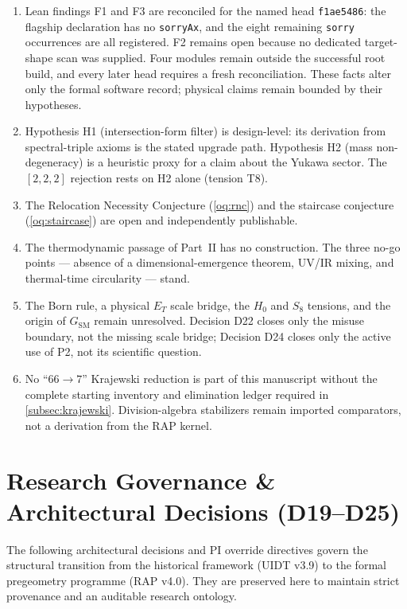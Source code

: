 \documentclass[12pt,a4paper,twoside]{article}
\theoremstyle{plain}
\theoremstyle{definition}
\theoremstyle{remark}
\begin{document}
\begin{enumerate}[leftmargin=1.6em,itemsep=0.25em]
\item Lean findings F1 and F3 are reconciled for the named head
\texttt{f1ae5486}: the flagship declaration has no \texttt{sorryAx}, and the
eight remaining \texttt{sorry} occurrences are all registered. F2 remains
open because no dedicated target-shape scan was supplied. Four modules remain
outside the successful root build, and every later head requires a fresh
reconciliation. These facts alter only the formal software record; physical
claims remain bounded by their hypotheses.
\item Hypothesis H1 (intersection-form filter) is design-level: its
derivation from spectral-triple axioms is the stated upgrade path.
Hypothesis H2 (mass non-degeneracy) is a heuristic proxy for a claim
about the Yukawa sector. The $[2,2,2]$ rejection rests on H2 alone
(tension T8).
\item The Relocation Necessity Conjecture (\cref{oq:rnc}) and the
staircase conjecture (\cref{oq:staircase}) are open and independently
publishable.
\item The thermodynamic passage of Part~II has no construction. The
three no-go points --- absence of a dimensional-emergence theorem,
UV/IR mixing, and thermal-time circularity --- stand.
\item The Born rule, a physical $E_T$ scale bridge, the $H_0$ and $S_8$
tensions, and the origin of $G_{\mathrm{SM}}$ remain unresolved. Decision
D22 closes only the misuse boundary, not the missing scale bridge; Decision
D24 closes only the active use of P2, not its scientific question.
\item No ``$66\to7$'' Krajewski reduction is part of this manuscript
without the complete starting inventory and elimination ledger required in
\cref{subsec:krajewski}. Division-algebra stabilizers remain imported
comparators, not a derivation from the RAP kernel.
\end{enumerate}


\clearpage
\appendix
\section{Research Governance \& Architectural Decisions (D19--D25)}
\label{app:pi-decisions}

The following architectural decisions and PI override directives govern the structural transition from the historical framework (UIDT v3.9) to the formal pregeometry programme (RAP v4.0). They are preserved here to maintain strict provenance and an auditable research ontology.
\end{document}
